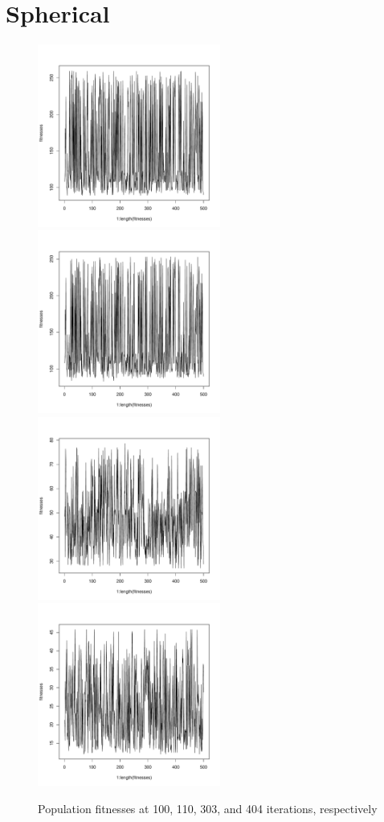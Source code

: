 \documentclass[12pt]{article}
\begin{document}
\section{Spherical}
\begin{figure}[!h]
        \begin{center}
		\includegraphics[width=60mm]{images/spherical.ss/ind_101.pdf}
		\includegraphics[width=60mm]{images/spherical.ss/ind_110.pdf}
		\includegraphics[width=60mm]{images/spherical.ss/ind_303.pdf}
		\includegraphics[width=60mm]{images/spherical.ss/ind_404.pdf}
               	\caption{Population fitnesses at 100, 110, 303, and 404 iterations, respectively}
                \label{spherical_ss_pop_fit}
        \end{center}
\end{figure}
\end{document}
